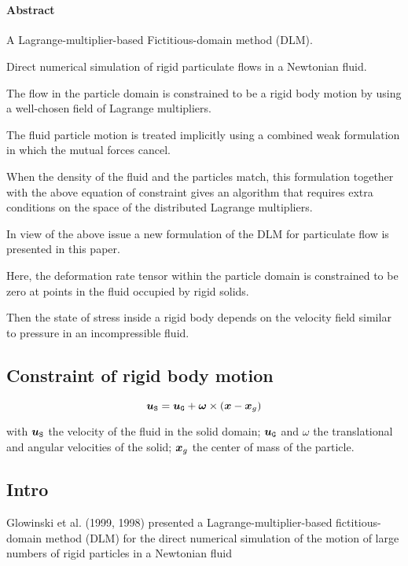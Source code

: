 \documentclass[10pt,a4paper]{article}
\begin{document}
\section{\cite{patankar2000new}}
%
\paragraph{Abstract}

A Lagrange-multiplier-based Fictitious-domain method (DLM).

Direct numerical simulation of rigid particulate flows in a Newtonian fluid.

The flow in the particle domain is constrained to be a rigid body motion by using a well-chosen field of Lagrange multipliers. 

The fluid particle motion is treated implicitly using a combined weak formulation in which the mutual forces cancel. 

When the density of the  fluid and the particles match, this formulation together with the above equation of constraint gives an algorithm that requires extra conditions on the space of the distributed Lagrange multipliers. 

In view of the above issue a new formulation of the DLM for particulate flow is presented in this paper. 

Here, the deformation rate tensor within the particle domain is constrained to be zero at points in the fluid occupied by rigid solids. 

Then the state of stress inside a rigid body depends on the velocity field similar to pressure in an incompressible  fluid. 

\subsection{Constraint of rigid body motion}

\begin{equation}
\label{eq:rigid_body}
\boldsymbol{u}_{\mathtt{S}} = \boldsymbol{u}_{\mathtt{G}} + \boldsymbol{\omega}\times (\boldsymbol{x}-\boldsymbol{x}_g)
\end{equation}

with $\boldsymbol{u}_{\mathtt{S}}$ the velocity of the fluid in the solid domain; $\boldsymbol{u}_{\mathtt{G}}$ and $\omega$ the translational and angular velocities of the solid; $\boldsymbol{x}_g$ the center of mass of the particle.

\subsection{Intro}
%
Glowinski et al. (1999, 1998) presented a Lagrange-multiplier-based fictitious-domain method (DLM) for the direct numerical simulation of the motion of large numbers of rigid particles in a Newtonian fluid
\end{document}
